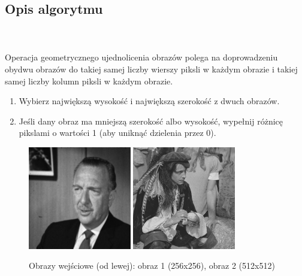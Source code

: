 \documentclass[final,a4paper,openany,12pt]{mwbk}
\begin{document}
\subsection*{Opis algorytmu}
\hfill
\\\\
\indent Operacja geometrycznego ujednolicenia obrazów polega na doprowadzeniu obydwu obrazów do takiej samej liczby wierszy piksli w każdym obrazie i takiej samej liczby kolumn piksli w każdym obrazie.
\begin{enumerate}
	\item Wybierz największą wysokość i największą szerokość z dwuch obrazów.\\
	\item Jeśli dany obraz ma mniejszą szerokość albo wysokość, wypełnij różnicę pikslami o wartości 1 (aby uniknąć dzielenia przez 0).
\end{enumerate}

\begin{figure}[H]
	\begin{center}
		\includegraphics[width=0.4\textwidth]{gentelman_gray}
		\includegraphics[width=0.4\textwidth]{pirate_gray}
	\end{center}
	\caption{Obrazy wejściowe (od lewej): obraz 1 (256x256), obraz 2 (512x512)}
\end{figure}
\end{document}
